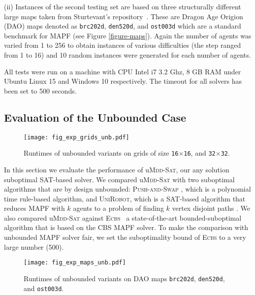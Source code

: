 \documentclass[letterpaper]{article}
\begin{document}
(ii) Instances of the second testing set are based on three structurally
different large maps taken from Sturtevant's
repository~\cite{sturtevant2012benchmarks}. These are Dragon Age Origion (DAO)
maps denoted as \texttt{brc202d}, \texttt{den520d}, and \texttt{ost003d} which
are a standard benchmark for MAPF (see Figure \ref{figure-maps}). Again the
number of agents was varied from 1 to 256 to obtain instances of various
difficulties (the step ranged from 1 to 16) and 10 random instances were
generated for each number of agents.

All tests were run on a machine with CPU Intel i7 3.2 Ghz, 8 GB RAM under
Ubuntu Linux 15 and Windows 10 respectively. The timeout for all solvers has
been set to 500 seconds.


\subsection{Evaluation of the Unbounded Case}

\begin{figure}[h]
\texttt{[image: fig\_exp\_grids\_unb.pdf]}
\caption{Runtimes of unbounded variants on grids of size  \texttt{16$\times$16}, and \texttt{32$\times$32}.}
\label{fig_exp_grids_unb}
\end{figure}

In this section we evaluate the performance of u\textsc{Mdd-Sat}, our any solution suboptimal SAT-based solver. 
We compared u\textsc{Mdd-Sat} with two suboptimal
algorithms that are by design unbounded: 
\textsc{Push-and-Swap} \cite{LunaB11,DBLP:journals/jair/WildeMW14}, which is
a polynomial time rule-based algorithm, 
and \textsc{UniRobot}\cite{DBLP:conf/ijcai/Surynek15}, which is a SAT-based algorithm that reduces MAPF
with $k$ agents to a problem of finding $k$ vertex disjoint paths \cite{SEYMOUR1980293}. 
We also compared u\textsc{Mdd-Sat} against \textsc{Ecbs}~\cite{barer2014suboptimal} a
state-of-the-art bounded-suboptimal algorithm that is based on the CBS MAPF solver. 
To make the comparison with unbounded MAPF solver fair, we set the suboptimality bound of \textsc{Ecbs} to a very large number 
(500). 


\begin{figure}[h]
\texttt{[image: fig\_exp\_maps\_unb.pdf]}
\caption{Runtimes of unbounded variants on DAO maps \texttt{brc202d}, \texttt{den520d}, and \texttt{ost003d}.}
\label{fig_exp_maps_unb}
\end{figure}
\end{document}
